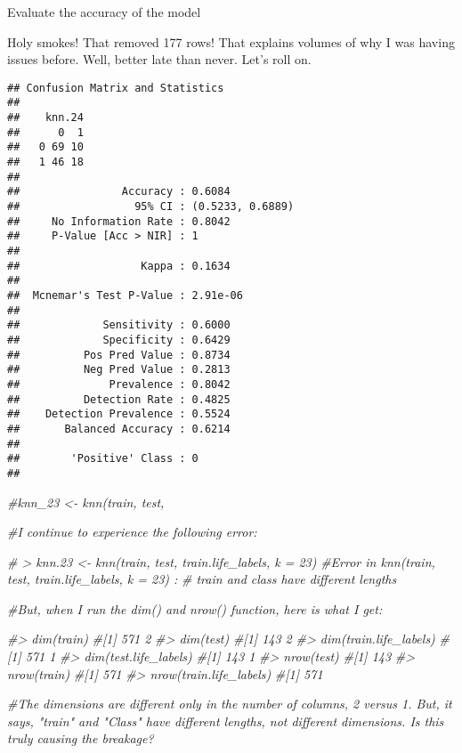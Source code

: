 \documentclass[
  ignorenonframetext,
]{beamer}
\newenvironment{Shaded}{\begin{snugshade}}{\end{snugshade}}
\newcommand{\CommentTok}[1]{\textcolor[rgb]{0.56,0.35,0.01}{\textit{#1}}}
\begin{document}
\begin{frame}[fragile]{Evaluate the accuracy of the model}
\begin{block}{Holy smokes! That removed 177 rows! That explains volumes
of why I was having issues before. Well, better late than never. Let's
roll on.}
\begin{verbatim}
## Confusion Matrix and Statistics
## 
##    knn.24
##      0  1
##   0 69 10
##   1 46 18
##                                           
##                Accuracy : 0.6084          
##                  95% CI : (0.5233, 0.6889)
##     No Information Rate : 0.8042          
##     P-Value [Acc > NIR] : 1               
##                                           
##                   Kappa : 0.1634          
##                                           
##  Mcnemar's Test P-Value : 2.91e-06        
##                                           
##             Sensitivity : 0.6000          
##             Specificity : 0.6429          
##          Pos Pred Value : 0.8734          
##          Neg Pred Value : 0.2813          
##              Prevalence : 0.8042          
##          Detection Rate : 0.4825          
##    Detection Prevalence : 0.5524          
##       Balanced Accuracy : 0.6214          
##                                           
##        'Positive' Class : 0               
## 
\end{verbatim}

\begin{Shaded}
\begin{Highlighting}[]
\CommentTok{\#knn\_23 \textless{}{-} knn(train, test, }

\CommentTok{\#I continue to experience the following error:}
  
\CommentTok{\#  \textgreater{} knn.23 \textless{}{-} knn(train, test, train.life\_labels, k = 23)}
\CommentTok{\#Error in knn(train, test, train.life\_labels, k = 23) : }
\CommentTok{\#  \textquotesingle{}train\textquotesingle{} and \textquotesingle{}class\textquotesingle{} have different lengths}

\CommentTok{\#But, when I run the dim() and nrow() function, here is what I get:}

\CommentTok{\#\textgreater{} dim(train)}
\CommentTok{\#[1] 571   2}
\CommentTok{\#\textgreater{} dim(test)}
\CommentTok{\#[1] 143   2}
\CommentTok{\#\textgreater{} dim(train.life\_labels)}
\CommentTok{\#[1] 571   1}
\CommentTok{\#\textgreater{} dim(test.life\_labels)}
\CommentTok{\#[1] 143   1}
\CommentTok{\#\textgreater{} nrow(test)}
\CommentTok{\#[1] 143}
\CommentTok{\#\textgreater{} nrow(train)}
\CommentTok{\#[1] 571}
\CommentTok{\#\textgreater{} nrow(train.life\_labels)}
\CommentTok{\#[1] 571}

\CommentTok{\#The dimensions are different only in the number of columns, 2 versus 1.  But, it says, "train" and "Class" have different lengths, not different dimensions.  Is this truly causing the breakage?  }
\end{Highlighting}
\end{Shaded}


\end{block}
\end{frame}
\end{document}
